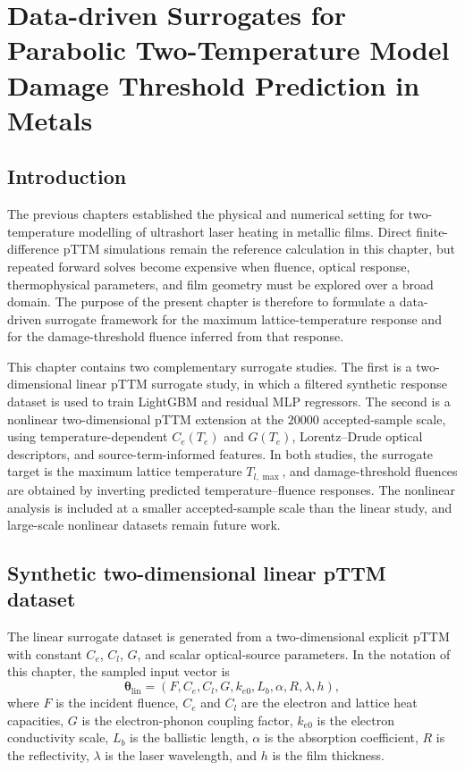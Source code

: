 \chapter{Data-driven Surrogates for Parabolic Two-Temperature Model Damage Threshold Prediction in Metals}
\label{ch:regression}

\section{Introduction}

The previous chapters established the physical and numerical setting for two-temperature modelling of ultrashort laser heating in metallic films. Direct finite-difference pTTM simulations remain the reference calculation in this chapter, but repeated forward solves become expensive when fluence, optical response, thermophysical parameters, and film geometry must be explored over a broad domain. The purpose of the present chapter is therefore to formulate a data-driven surrogate framework for the maximum lattice-temperature response and for the damage-threshold fluence inferred from that response.

This chapter contains two complementary surrogate studies. The first is a two-dimensional linear pTTM surrogate study, in which a filtered synthetic response dataset is used to train LightGBM and residual MLP regressors. The second is a nonlinear two-dimensional pTTM extension at the \(\num{20000}\) accepted-sample scale, using temperature-dependent \(C_e(T_e)\) and \(G(T_e)\), Lorentz--Drude optical descriptors, and source-term-informed features. In both studies, the surrogate target is the maximum lattice temperature \(T_{l,\max}\), and damage-threshold fluences are obtained by inverting predicted temperature--fluence responses. The nonlinear analysis is included at a smaller accepted-sample scale than the linear study, and large-scale nonlinear datasets remain future work.

\section{Synthetic two-dimensional linear pTTM dataset}

The linear surrogate dataset is generated from a two-dimensional explicit pTTM with constant $C_e$, $C_l$, $G$, and scalar optical-source parameters. In the notation of this chapter, the sampled input vector is
\begin{equation}
    \boldsymbol{\theta}_{\mathrm{lin}}
    =
    \left(
    F, C_e, C_l, G, k_{e0}, L_b, \alpha, R, \lambda, h
    \right),
\end{equation}
where $F$ is the incident fluence, $C_e$ and $C_l$ are the electron and lattice heat capacities, $G$ is the electron-phonon coupling factor, $k_{e0}$ is the electron conductivity scale, $L_b$ is the ballistic length, $\alpha$ is the absorption coefficient, $R$ is the reflectivity, $\lambda$ is the laser wavelength, and $h$ is the film thickness.

